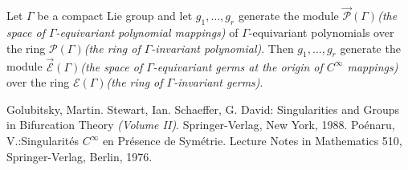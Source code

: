 \documentclass[12pt]{article}
\begin{document}
Let $\Gamma$ be a compact Lie group and let $g_1,\ldots ,g_r$ generate the module $\vec{\mathcal{P}}(\Gamma )$\textit{(the space of $\Gamma$-equivariant polynomial mappings)} of $\Gamma$-equivariant polynomials over the ring $\mathcal{P}(\Gamma)$\textit{(the ring of $\Gamma$-invariant polynomial)}.  Then $g_1,\ldots ,g_r$ generate the module $\vec{\mathcal{E}}(\Gamma)$\textit{(the space of $\Gamma$-equivariant germs at the origin of $C^\infty$ mappings)} over the ring $\mathcal{E}(\Gamma)$\textit{(the ring of $\Gamma$-invariant germs)}. \cite{1}
\begin{thebibliography}{2}
 Golubitsky, Martin. Stewart, Ian. Schaeffer, G. David: Singularities and Groups in Bifurcation Theory \textit{(Volume II)}. Springer-Verlag, New York, 1988.
 Po\'enaru, V.:Singularit\'es $C^\infty$ en Pr\'esence de Sym\'etrie. Lecture Notes in Mathematics 510, Springer-Verlag, Berlin, 1976.
\end{thebibliography}
\end{document}
